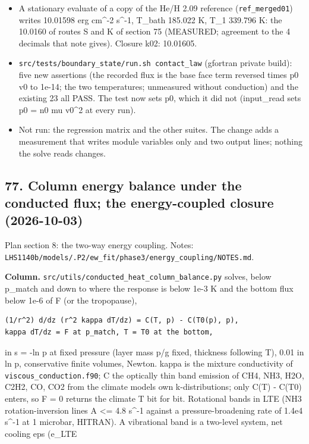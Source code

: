 \documentclass[english,a4paper]{my_memo}
\providecommand{\tightlist}{\setlength{\itemsep}{0pt}\setlength{\parskip}{0pt}}
\begin{document}
\begin{itemize}
\tightlist
\item
  A stationary evaluate of a copy of the He/H 2.09 reference
  (\texttt{ref\_merged01}) writes 10.01598 erg cm\^{}-2 s\^{}-1, T\_bath 185.022 K,
  T\_1 339.796 K: the 10.0160 of routes S and K of section 75
  (MEASURED; agreement to the 4 decimals that note gives). Closure k02:
  10.01605.
\item
  \texttt{src/tests/boundary\_state/run.sh\ contact\_law} (gfortran private build):
  five new assertions (the recorded flux is the base face term reversed
  times p0 v0 to 1e-14; the two temperatures; unmeasured without
  conduction) and the existing 23 all PASS. The test now sets p0, which it
  did not (input\_read sets p0 = n0 mu v0\^{}2 at every run).
\item
  Not run: the regression matrix and the other suites. The change adds a
  measurement that writes module variables only and two output lines;
  nothing the solve reads changes.
\end{itemize}

\subsection{77. Column energy balance under the conducted flux; the energy-coupled closure (2026-10-03)}\label{77-column-energy-balance-under-the-conducted-flux-the-energy-coupled-closure-2026-10-03}

Plan section 8: the two-way energy coupling. Notes:
\texttt{LHS1140b/models/.P2/ew\_fit/phase3/energy\_coupling/NOTES.md}.

\textbf{Column.} \texttt{src/utils/conducted\_heat\_column\_balance.py} solves, below
p\_match and down to where the response is below 1e-3 K and the bottom
flux below 1e-6 of F (or the tropopause),

\begin{verbatim}
(1/r^2) d/dz (r^2 kappa dT/dz) = C(T, p) - C(T0(p), p),
kappa dT/dz = F at p_match, T = T0 at the bottom,
\end{verbatim}

in s = -ln p at fixed pressure (layer mass p/g fixed, thickness following
T), 0.01 in ln p, conservative finite volumes, Newton. kappa is the
mixture conductivity of \texttt{viscous\_conduction.f90}; C the optically thin
band emission of CH4, NH3, H2O, C2H2, CO, CO2 from the climate model\textquotesingle s own
k-distributions; only C(T) - C(T0) enters, so F = 0 returns the climate T
bit for bit. Rotational bands in LTE (NH3 rotation-inversion lines A \textless=
4.8 s\^{}-1 against a pressure-broadening rate of 1.4e4 s\^{}-1 at 1 microbar,
HITRAN). A vibrational band is a two-level system, net cooling eps (e\_LTE
\end{document}
